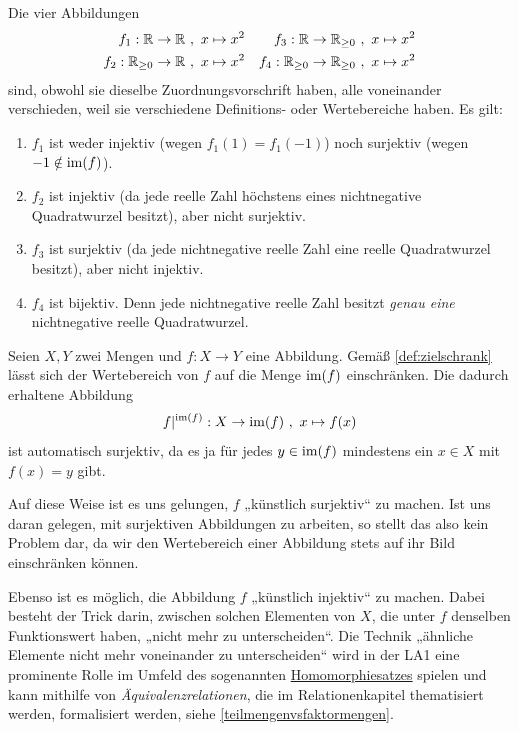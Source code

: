 \begin{bsp} \label{bsp:injsur}
    Die vier Abbildungen
    \begin{align*}
        f_1 : \mathbb R \to \mathbb R \ &,\ x\mapsto x^2 & f_3 :\mathbb R\to \mathbb R_{\ge 0} \ &,\ x\mapsto x^2 \\
        f_2 : \mathbb R_{\ge 0} \to \mathbb R \ &,\ x\mapsto x^2 & f_4 :\mathbb R_{\ge 0} \to \mathbb R_{\ge 0} \ &,\ x\mapsto x^2
    \end{align*}
    sind, obwohl sie dieselbe Zuordnungsvorschrift haben, alle voneinander verschieden, weil sie verschiedene Definitions- oder Wertebereiche haben. Es gilt:
    \begin{enumerate}
        \item $f_1$ ist weder injektiv (wegen $f_1(1)=f_1(-1)$) noch surjektiv (wegen $-1\notin \operatorname{im}(f)$).
        \item $f_2$ ist injektiv (da jede reelle Zahl höchstens eines nichtnegative Quadratwurzel besitzt), aber nicht surjektiv.
        \item $f_3$ ist surjektiv (da jede nichtnegative reelle Zahl eine reelle Quadratwurzel besitzt), aber nicht injektiv.
        \item $f_4$ ist bijektiv. Denn jede nichtnegative reelle Zahl besitzt \emph{genau eine} nichtnegative reelle Quadratwurzel.
    \end{enumerate}
\end{bsp}


\begin{vorschau} \label{surjektivmachen}
    Seien $X,Y$ zwei Mengen und $f:X\to Y$ eine Abbildung. Gemäß \cref{def:zielschrank} lässt sich der Wertebereich von $f$ auf die Menge $\operatorname{im}(f)$ einschränken. Die dadurch erhaltene Abbildung
        \[ f\vert^{\operatorname{im}(f)} : X \to \operatorname{im}(f) \ ,\ x\mapsto f(x) \]
    ist automatisch surjektiv, da es ja für jedes $y\in \operatorname{im}(f)$ mindestens ein $x\in X$ mit $f(x)=y$ gibt.

    Auf diese Weise ist es uns gelungen, $f$ „künstlich surjektiv“ zu machen. Ist uns daran gelegen, mit surjektiven Abbildungen zu arbeiten, so stellt das also kein Problem dar, da wir den Wertebereich einer Abbildung stets auf ihr Bild einschränken können.

    Ebenso ist es möglich, die Abbildung $f$ „künstlich injektiv“ zu machen. Dabei besteht der Trick darin, zwischen solchen Elementen von $X$, die unter $f$ denselben Funktionswert haben, „nicht mehr zu unterscheiden“. Die Technik „ähnliche Elemente nicht mehr voneinander zu unterscheiden“ wird in der LA1 eine prominente Rolle im Umfeld des sogenannten \href{https://de.wikipedia.org/wiki/Homomorphiesatz}{Homomorphiesatzes} spielen und kann mithilfe von \emph{Äquivalenzrelationen}, die im Relationenkapitel thematisiert werden, formalisiert werden, siehe \cref{teilmengenvsfaktormengen}.
\end{vorschau}





